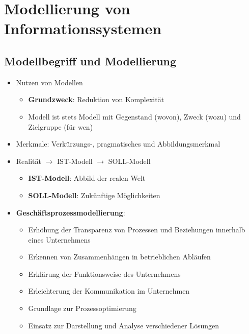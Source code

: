 \documentclass[12pt,a4paper]{article}
\author{Pauline Speckmann}
\begin{document}
\setcounter{section}{1}
\section{Modellierung von Informationssystemen}


\vspace*{1cm}
\subsection{Modellbegriff und Modellierung} %
\begin{itemize}
   \item Nutzen von Modellen
      \begin{itemize}
         \item \textbf{Grundzweck}: Reduktion von Komplexität
         \item Modell ist stets Modell mit Gegenstand (wovon), Zweck (wozu) und Zielgruppe (für wen)
      \end{itemize}
      
   \item Merkmale: Verkürzungs-, pragmatisches und Abbildungsmerkmal
   
   \item Realität $\rightarrow$ IST-Modell $\rightarrow$ SOLL-Modell
      \begin{itemize}
         \item \textbf{IST-Modell}:  Abbild der realen Welt
         \item \textbf{SOLL-Modell}: Zukünftige Möglichkeiten
      \end{itemize}

   \item \textbf{Geschäftsprozessmodellierung}:
      \begin{itemize}
         \item Erhöhung der Transparenz von Prozessen und Beziehungen innerhalb eines Unternehmens
         \item Erkennen von Zusammenhängen in betrieblichen Abläufen
         \item Erklärung der Funktionsweise des Unternehmens
         \item Erleichterung der Kommunikation im Unternehmen
         \item Grundlage zur Prozessoptimierung
         \item Einsatz zur Darstellung und Analyse verschiedener Lösungen
      \end{itemize}


\end{itemize}
\end{document}
